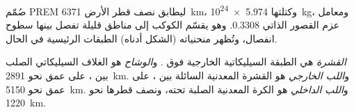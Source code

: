 صُمّم PREM ليطابق نصف قطر الأرض \qty{6371}{km}، وكتلتها \qty{5.974e24}{kg}، ومعامل عزم القصور الذاتي $0.3308$. وهو يقسّم الكوكب إلى مناطق قليلة تفصل بينها سطوح انفصال، وتُظهر منحنياته (الشكل أدناه) الطبقات الرئيسية في الحال.

\begin{definition}\label{def:b1:layered-earth:layers}
\emph{القشرة} هي الطبقة السيليكاتية الخارجية فوق . و\emph{الوشاح} هو الغلاف السيليكاتي الصلب بين  ، على عمق نحو \qty{2891}{km}. و\emph{اللب الخارجي} هو القشرة المعدنية السائلة بين  ، على عمق نحو \qty{5150}{km}. و\emph{اللب الداخلي} هو الكرة المعدنية الصلبة تحته، ونصف قطرها نحو \qty{1220}{km}.
\end{definition}

